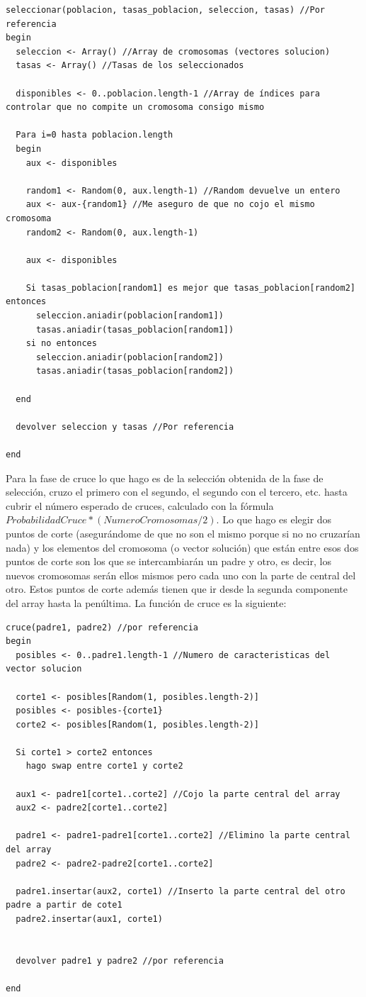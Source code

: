 	\begin{lstlisting}
seleccionar(poblacion, tasas_poblacion, seleccion, tasas) //Por referencia 
begin
  seleccion <- Array() //Array de cromosomas (vectores solucion)
  tasas <- Array() //Tasas de los seleccionados
  
  disponibles <- 0..poblacion.length-1 //Array de índices para controlar que no compite un cromosoma consigo mismo
  
  Para i=0 hasta poblacion.length
  begin
    aux <- disponibles
    
    random1 <- Random(0, aux.length-1) //Random devuelve un entero
    aux <- aux-{random1} //Me aseguro de que no cojo el mismo cromosoma
    random2 <- Random(0, aux.length-1)
    
    aux <- disponibles
    
    Si tasas_poblacion[random1] es mejor que tasas_poblacion[random2] entonces
      seleccion.aniadir(poblacion[random1])
      tasas.aniadir(tasas_poblacion[random1])
    si no entonces
      seleccion.aniadir(poblacion[random2])
      tasas.aniadir(tasas_poblacion[random2])
    
  end
  
  devolver seleccion y tasas //Por referencia
  
end
	\end{lstlisting}
	
Para la fase de cruce lo que hago es de la selección obtenida de la fase de selección, cruzo el primero con el segundo, el segundo con el tercero, etc. hasta cubrir el número esperado de cruces, calculado con la fórmula $ProbabilidadCruce * (NumeroCromosomas/2)$. Lo que hago es elegir dos puntos de corte (asegurándome de que no son el mismo porque si no no cruzarían nada) y los elementos del cromosoma (o vector solución) que están entre esos dos puntos de corte son los que se intercambiarán un padre y otro, es decir, los nuevos cromosomas serán ellos mismos pero cada uno con la parte de central del otro. Estos puntos de corte además tienen que ir desde la segunda componente del array hasta la penúltima. La función de cruce es la siguiente:
\begin{lstlisting}
cruce(padre1, padre2) //por referencia
begin
  posibles <- 0..padre1.length-1 //Numero de caracteristicas del vector solucion
  
  corte1 <- posibles[Random(1, posibles.length-2)]
  posibles <- posibles-{corte1}
  corte2 <- posibles[Random(1, posibles.length-2)]
  
  Si corte1 > corte2 entonces
    hago swap entre corte1 y corte2
    
  aux1 <- padre1[corte1..corte2] //Cojo la parte central del array
  aux2 <- padre2[corte1..corte2]
  
  padre1 <- padre1-padre1[corte1..corte2] //Elimino la parte central del array
  padre2 <- padre2-padre2[corte1..corte2]
  
  padre1.insertar(aux2, corte1) //Inserto la parte central del otro padre a partir de cote1
  padre2.insertar(aux1, corte1)
  
  
  devolver padre1 y padre2 //por referencia
  
end
\end{lstlisting}


